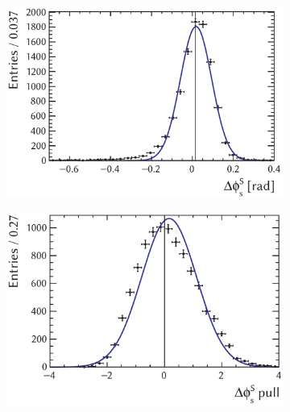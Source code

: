 \begin{figure}[tb]
  \centering
  \begin{subfigure}{0.49\textwidth}
    \includegraphics[width=\textwidth]{graphics/results/parDist_polarDep_phiCPRel_AS}
    \caption{}
  \end{subfigure}
  \hfill%
  \begin{subfigure}{0.49\textwidth}
    \includegraphics[width=\textwidth]{graphics/results/pullDist_polarDep_phiCPRel_AS}
    \caption{}
  \end{subfigure}


\end{figure}
